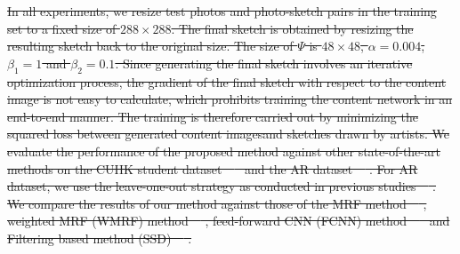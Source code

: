 \documentclass[10pt,twocolumn,letterpaper]{article}
\providecommand{\DIFdeltex}[1]{{\protect\color{red}\sout{#1}}}                      %
\providecommand{\DIFdel}[1]{\texorpdfstring{\DIFdeltex{#1}}{}} %
\begin{document}
\DIFdel{In all experiments, we resize test photos and photo-sketch pairs in the training set to a fixed size of $288\times288$. The final sketch is obtained by resizing the resulting sketch back to the original size. The size of $\Psi$ is $48\times48$, $\alpha=0.004$, $\beta_1=1$ and $\beta_2=0.1$. Since generating the final sketch involves an iterative optimization process, the gradient of the final sketch with respect to the content image is not easy to calculate, which prohibits training the content network in an end-to-end manner.  The training is therefore carried out by minimizing the squared loss between generated content imagesand sketches drawn by artists. We evaluate the performance of the proposed method against other state-of-the-art methods on the CUHK student dataset~\mbox{%
\cite{wang2009face} }%
and the AR dataset~\mbox{%
\cite{martinez1998r}}%
. For AR dataset, we use the leave-one-out strategy as conducted in previous studies~\mbox{%
\cite{song2014real,wang2009face}}%
. We compare the results of our method against those of the MRF method~\mbox{%
\cite{wang2009face}}%
, weighted MRF (WMRF) method~\mbox{%
\cite{zhou2012markov}}%
, feed-forward CNN (FCNN) method~\mbox{%
\cite{zhang2015end} }%
and Filtering based method (SSD)~\mbox{%
\cite{song2014real}}%
.
}%
\end{document}
